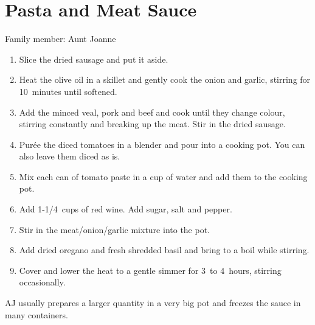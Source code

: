 \chapter{Pasta and Meat Sauce}
\label{ch:pastameatsauce}


Family member: Aunt Joanne

\begin{enumerate}
    \item Slice the dried sausage and put it aside.
    \item Heat the olive oil in a skillet and gently cook the onion and garlic, stirring for 10~minutes until softened.
    \item Add the minced veal, pork and beef and cook until they change colour, stirring constantly and breaking up the meat. Stir in the dried sausage.
    \item Purée the diced tomatoes in a blender and pour into a cooking pot. You can also leave them diced as is.
    \item Mix each can of tomato paste in a cup of water and add them to the cooking pot.
    \item Add 1-1/4~cups of red wine. Add sugar, salt and pepper.
    \item Stir in the meat/onion/garlic mixture into the pot.
    \item Add dried oregano and fresh shredded basil and bring to a boil while stirring.
    \item Cover and lower the heat to a gentle simmer for 3~to 4~hours, stirring occasionally.
\end{enumerate}

AJ usually prepares a larger quantity in a very big pot and freezes the sauce in many containers.
